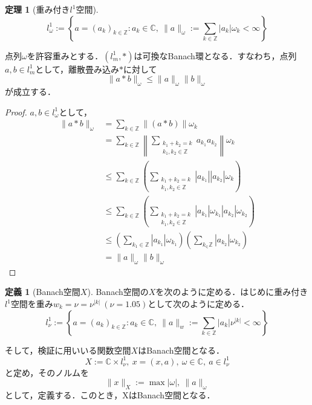 \documentclass[11pt,a4paper]{jsarticle}
\theoremstyle{definition}
\newtheorem{dfn}{定義}
\newtheorem{thm}{定理}
\begin{document}
\begin{thm}[重み付き$l^1$空間]
  \begin{equation*}
    l_\omega^1 := \left\{ a = (a_k)_{k\in\mathbb{Z}}:a_k\in\mathbb{C},\ \|a\|_\omega:=\sum_{k\in\mathbb{Z}}|a_k|\omega_k < \infty\right\}
  \end{equation*}

  点列$\omega$を許容重みとする．$\left(l_m^1, *\right)$は可換なBanach環となる．すなわち，点列$a,b\in l^1_m$として，離散畳み込み$*$に対して
  \begin{equation*}
    \|a*b\|_\omega \leq \|a\|_\omega\|b\|_\omega
  \end{equation*}
  が成立する．
\end{thm}

\begin{proof}
  $a,b\in l_{\omega}^1$として，
  \begin{equation*}
    \begin{split}
      \|a*b\|_\omega &= \sum_{k\in\mathbb{Z}} \|(a*b)\|\omega_k \\
      &= \sum_{k\in\mathbb{Z}} \left\|\sum_{\substack{k_1+k_2=k \\ k_1,k_2\in\mathbb{Z}}}a_{k_1} a_{k_2}\right\| \omega_k \\
      &\leq \sum_{k\in\mathbb{Z}} \left(\sum_{\substack{k_1+k_2=k \\ k_1,k_2\in\mathbb{Z}}}|a_{k_1}||a_{k_2}|\omega_k\right)\\
      &\leq \sum_{k\in\mathbb{Z}} \left(\sum_{\substack{k_1+k_2=k \\ k_1,k_2\in\mathbb{Z}}}|a_{k_1}|\omega_{k_1}|a_{k_2}|\omega_{k_2}\right)\\
      &\leq \left(\sum_{k_1\in\mathbb{Z}}|a_{k_1}|\omega_{k_1}\right) \left(\sum_{k_\in\mathbb{Z}}|a_{k_2}|\omega_{k_2}\right) \\
      &= \|a\|_\omega\|b\|_\omega
    \end{split}
  \end{equation*}
\end{proof}

\begin{dfn}[Banach空間$X$]
  Banach空間の$X$を次のように定める．はじめに重み付き$l^1$空間を重み$w_k=\nu=\nu^{|k|}\ (\nu=1.05)$として次のように定める．
  \begin{equation*}
    l_{\nu}^1 := \left\{ a = (a_k)_{k\in\mathbb{Z}}:a_k\in\mathbb{C},\ \|a\|_{w} := \sum_{k\in\mathbb{Z}}|a_k|\nu^{|k|} < \infty\right\}
  \end{equation*}

  そして，検証に用いいる関数空間$X$はBanach空間となる．
  \begin{equation*}
    X:=\mathbb{C}\times l_{\nu}^1,\ x=(x,a),\ \omega \in \mathbb{C},\ a\in l_{\nu}^1
  \end{equation*}
  と定め，そのノルムを
  \begin{equation*}
    \|x\|_X:=\max |\omega|,\ \|a\|_{\omega}
  \end{equation*}
  として，定義する．このとき，XはBanach空間となる．
\end{dfn}
\end{document}
